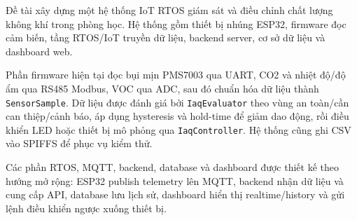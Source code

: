 \noindent
Đề tài xây dựng một hệ thống IoT RTOS giám sát và điều chỉnh chất lượng không khí trong phòng học. Hệ thống gồm thiết bị nhúng ESP32, firmware đọc cảm biến, tầng RTOS/IoT truyền dữ liệu, backend server, cơ sở dữ liệu và dashboard web.

\noindent
Phần firmware hiện tại đọc bụi mịn PMS7003 qua UART, CO2 và nhiệt độ/độ ẩm qua RS485 Modbus, VOC qua ADC, sau đó chuẩn hóa dữ liệu thành \texttt{SensorSample}. Dữ liệu được đánh giá bởi \texttt{IaqEvaluator} theo vùng an toàn/cần can thiệp/cảnh báo, áp dụng hysteresis và hold-time để giảm dao động, rồi điều khiển LED hoặc thiết bị mô phỏng qua \texttt{IaqController}. Hệ thống cũng ghi CSV vào SPIFFS để phục vụ kiểm thử.

\noindent
Các phần RTOS, MQTT, backend, database và dashboard được thiết kế theo hướng mở rộng: ESP32 publish telemetry lên MQTT, backend nhận dữ liệu và cung cấp API, database lưu lịch sử, dashboard hiển thị realtime/history và gửi lệnh điều khiển ngược xuống thiết bị.
